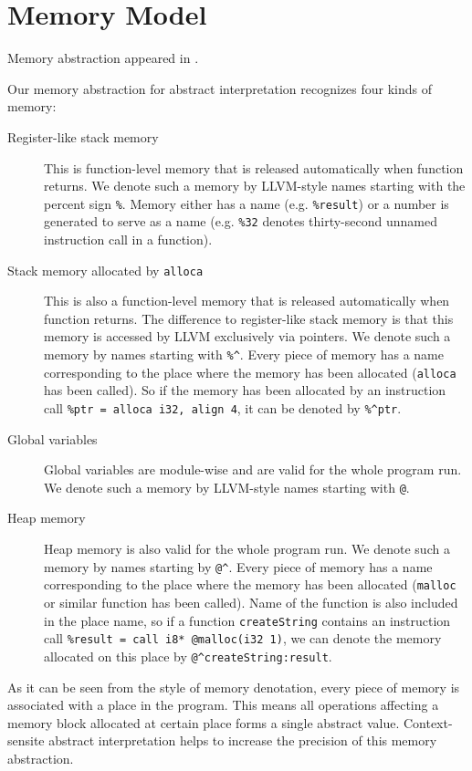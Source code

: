 \documentclass[a4paper]{book}
\begin{document}
\section{Memory Model}
Memory abstraction appeared in \cite{M06}.

Our memory abstraction for abstract interpretation recognizes four
kinds of memory:
\begin{description}
\item[Register-like stack memory] This is function-level memory that
  is released automatically when function returns.  We denote such a
  memory by LLVM-style names starting with the percent sign
  \texttt{\%}.  Memory either has a name (e.g. \texttt{\%result}) or a
  number is generated to serve as a name (e.g. \texttt{\%32} denotes
  thirty-second unnamed instruction call in a function).
\item[Stack memory allocated by \texttt{alloca}] This is also a
  function-level memory that is released automatically when function
  returns.  The difference to register-like stack memory is that this
  memory is accessed by LLVM exclusively via pointers.  We denote such
  a memory by names starting with \texttt{\%\^}.  Every piece of
  memory has a name corresponding to the place where the memory has
  been allocated (\texttt{alloca} has been called).  So if the memory
  has been allocated by an instruction call \texttt{\%ptr = alloca
    i32, align 4}, it can be denoted by \texttt{\%\^{}ptr}.
\item[Global variables] Global variables are module-wise and are valid
  for the whole program run.  We denote such a memory by LLVM-style
  names starting with \texttt{@}.
\item[Heap memory] Heap memory is also valid for the whole program
  run.  We denote such a memory by names starting by \texttt{@\^}.
  Every piece of memory has a name corresponding to the place where
  the memory has been allocated (\texttt{malloc} or similar function
  has been called).  Name of the function is also included in the
  place name, so if a function \texttt{createString} contains an
  instruction call \texttt{\%result = call i8* @malloc(i32 1)}, we can
  denote the memory allocated on this place by
  \texttt{@\^{}createString:result}.
\end{description}

As it can be seen from the style of memory denotation, every piece of
memory is associated with a place in the program.  This means all
operations affecting a memory block allocated at certain place forms a
single abstract value.  Context-sensite abstract interpretation helps
to increase the precision of this memory abstraction.
\end{document}
